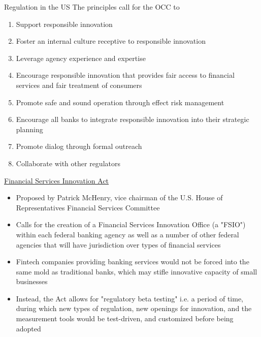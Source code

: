 \documentclass[10pt]{beamer}
\begin{document}
\begin{frame}{Regulation in the US}
	The principles call for the OCC to
	\begin{enumerate}
		\item Support responsible innovation
		\item Foster an internal culture receptive to responsible innovation
		\item Leverage agency experience and expertise
		\item Encourage responsible innovation that provides fair access to financial services and fair treatment of consumers
		\item Promote safe and sound operation through effect risk management
		\item Encourage all banks to integrate responsible innovation into their strategic planning
		\item Promote dialog through formal outreach
		\item Collaborate with other regulators
	\end{enumerate}
\end{frame}



\begin{frame}{\href{https://www.congress.gov/bill/114th-congress/house-bill/6118/text}{Financial Services Innovation Act}}
	\begin{itemize}
		\item Proposed by Patrick McHenry, vice chairman of the U.S. House of Representatives Financial Services Committee
		\item Calls for the creation of a Financial Services Innovation Office (a "FSIO") within each federal banking agency as well as a number of other federal agencies that will have jurisdiction over types of financial services
		\item Fintech companies providing banking services would not be forced into the same mold as traditional banks, which may stifle innovative capacity of small businesses
		\item Instead, the Act allows for "regulatory beta testing" i.e. a period of time, during which new types of regulation, new openings for innovation, and the measurement tools would be test-driven, and customized before being adopted
	\end{itemize}
\end{frame}
\end{document}
